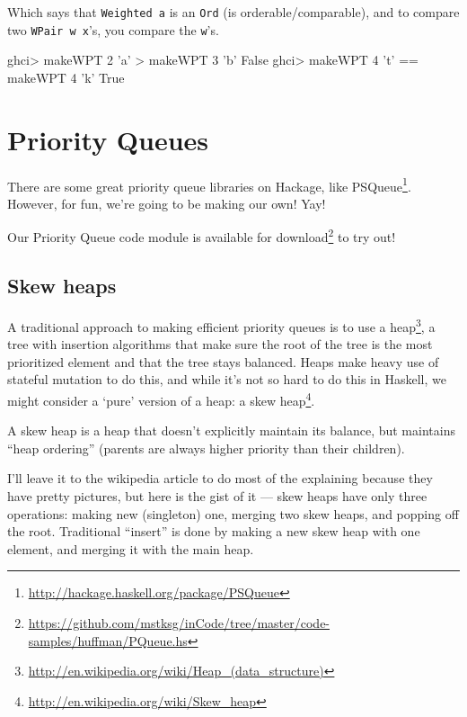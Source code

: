 \documentclass[]{article}
\newenvironment{Shaded}{}{}
\newcommand{\DataTypeTok}[1]{\textcolor[rgb]{0.56,0.13,0.00}{#1}}
\newcommand{\DecValTok}[1]{\textcolor[rgb]{0.25,0.63,0.44}{#1}}
\newcommand{\CharTok}[1]{\textcolor[rgb]{0.25,0.44,0.63}{#1}}
\newcommand{\FunctionTok}[1]{\textcolor[rgb]{0.02,0.16,0.49}{#1}}
\newcommand{\NormalTok}[1]{#1}
\renewcommand{\href}[2]{#2\footnote{\url{#1}}}
\begin{document}
Which says that \texttt{Weighted\ a} is an \texttt{Ord} (is
orderable/comparable), and to compare two \texttt{WPair\ w\ x}'s, you compare
the \texttt{w}'s.

\begin{Shaded}
\begin{Highlighting}[]
\NormalTok{ghci}\FunctionTok{>}\NormalTok{ makeWPT }\DecValTok{2} \CharTok{'a'} \FunctionTok{>}\NormalTok{ makeWPT }\DecValTok{3} \CharTok{'b'}
\DataTypeTok{False}
\NormalTok{ghci}\FunctionTok{>}\NormalTok{ makeWPT }\DecValTok{4} \CharTok{'t'} \FunctionTok{==}\NormalTok{ makeWPT }\DecValTok{4} \CharTok{'k'}
\DataTypeTok{True}
\end{Highlighting}
\end{Shaded}

\section{Priority Queues}\label{priority-queues}

There are some great priority queue libraries on Hackage, like
\href{http://hackage.haskell.org/package/PSQueue}{PSQueue}. However, for fun,
we're going to be making our own! Yay!

Our Priority Queue code module is
\href{https://github.com/mstksg/inCode/tree/master/code-samples/huffman/PQueue.hs}{available
for download} to try out!

\subsection{Skew heaps}\label{skew-heaps}

A traditional approach to making efficient priority queues is to use a
\href{http://en.wikipedia.org/wiki/Heap_(data_structure)}{heap}, a tree with
insertion algorithms that make sure the root of the tree is the most prioritized
element and that the tree stays balanced. Heaps make heavy use of stateful
mutation to do this, and while it's not so hard to do this in Haskell, we might
consider a `pure' version of a heap: a
\href{http://en.wikipedia.org/wiki/Skew_heap}{skew heap}.

A skew heap is a heap that doesn't explicitly maintain its balance, but
maintains ``heap ordering'' (parents are always higher priority than their
children).

I'll leave it to the wikipedia article to do most of the explaining because they
have pretty pictures, but here is the gist of it --- skew heaps have only three
operations: making new (singleton) one, merging two skew heaps, and popping off
the root. Traditional ``insert'' is done by making a new skew heap with one
element, and merging it with the main heap.
\end{document}
